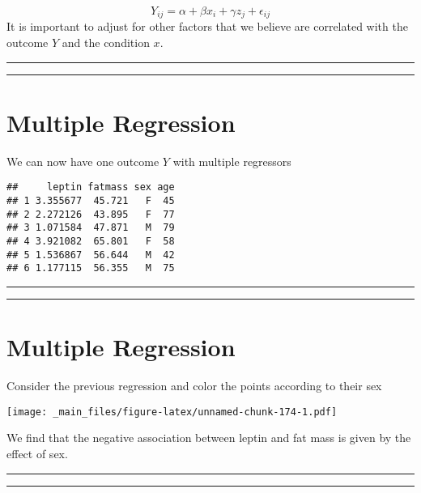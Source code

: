 \documentclass[
]{book}
\begin{document}
\[Y_{ij} = \alpha + \beta x_i +\gamma z_j+\epsilon_{ij}\]
It is important to adjust for other factors that we believe are correlated with the outcome \(Y\) and the condition \(x\).

\begin{center}\rule{0.5\linewidth}{0.5pt}\end{center}

\begin{center}\rule{0.5\linewidth}{0.5pt}\end{center}

\hypertarget{multiple-regression-1}{%
\section{Multiple Regression}\label{multiple-regression-1}}

We can now have one outcome \(Y\) with multiple regressors

\begin{verbatim}
##     leptin fatmass sex age
## 1 3.355677  45.721   F  45
## 2 2.272126  43.895   F  77
## 3 1.071584  47.871   M  79
## 4 3.921082  65.801   F  58
## 5 1.536867  56.644   M  42
## 6 1.177115  56.355   M  75
\end{verbatim}

\begin{center}\rule{0.5\linewidth}{0.5pt}\end{center}

\begin{center}\rule{0.5\linewidth}{0.5pt}\end{center}

\hypertarget{multiple-regression-2}{%
\section{Multiple Regression}\label{multiple-regression-2}}

Consider the previous regression and color the points according to their sex

\texttt{[image: \_main\_files/figure-latex/unnamed-chunk-174-1.pdf]}

We find that the negative association between leptin and fat mass is given by the effect of sex.

\begin{center}\rule{0.5\linewidth}{0.5pt}\end{center}

\begin{center}\rule{0.5\linewidth}{0.5pt}\end{center}
\end{document}
